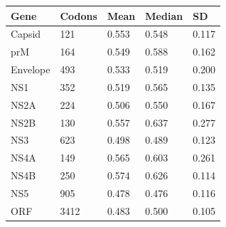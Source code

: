 \footnotesize
\begin{tabu} to \columnwidth {X[l]X[l]X[l]X[l]X[l]}
	\rowfont[1]{\bfseries}
	\toprule
	Gene     & Codons & Mean  & Median & SD    \\ \midrule
	Capsid   & 121    & 0.553 & 0.548  & 0.117 \\
	prM      & 164    & 0.549 & 0.588  & 0.162 \\
	Envelope & 493    & 0.533 & 0.519  & 0.200 \\
	NS1      & 352    & 0.519 & 0.565  & 0.135 \\
	NS2A     & 224    & 0.506 & 0.550  & 0.167 \\
	NS2B     & 130    & 0.557 & 0.637  & 0.277 \\
	NS3      & 623    & 0.498 & 0.489  & 0.123 \\
	NS4A     & 149    & 0.565 & 0.603  & 0.261 \\
	NS4B     & 250    & 0.574 & 0.626  & 0.114 \\
	NS5      & 905    & 0.478 & 0.476  & 0.116 \\
	ORF      & 3412   & 0.483 & 0.500  & 0.105 \\ \bottomrule
\end{tabu}